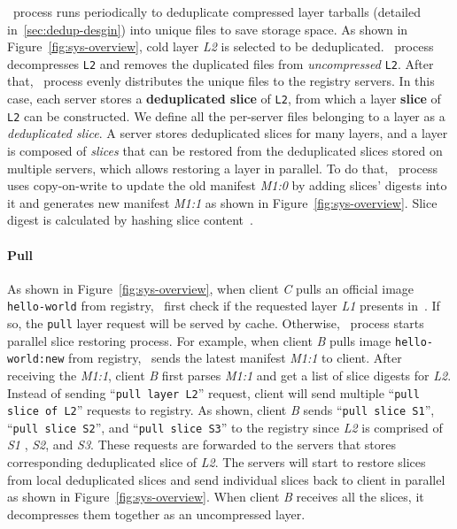 \dedupname~process runs periodically to deduplicate compressed layer tarballs (detailed in~\cref{sec:dedup-desgin})
into unique files to save storage space.
As shown in Figure~\ref{fig:sys-overview}, cold layer \textit{L2} is selected to be deduplicated.
\dedupname~process decompresses \texttt{L2} and removes the duplicated files from \emph{uncompressed} \texttt{L2}.
After that, \dedupname~process evenly distributes the unique files to the registry servers.
In this case, each server stores a \textbf{deduplicated slice} of \texttt{L2}, from which a layer \textbf{slice} of \texttt{L2}
can be constructed.
We define all the per-server files belonging to a layer as a {\em deduplicated slice}. 
A server stores deduplicated slices for many layers, 
and a layer is composed of \emph{slices} 
that can be restored from the deduplicated slices stored on multiple servers, 
which allows restoring a layer in parallel. 
To do that, 
\dedupname~process uses copy-on-write to update the old manifest \textit{M1:0} by adding slices' digests into it 
and generates new manifest \textit{M1:1} as shown in Figure~\ref{fig:sys-overview}.
Slice digest is calculated by hashing slice content~\cite{xxx}.

\paragraph{Pull}

As shown in Figure~\ref{fig:sys-overview},
when client \textit{C} pulls an official image \texttt{hello-world} from registry,
\sysname~first check if the requested layer \textit{L1} presents in~\preconstructcachename.
If so, the \texttt{pull} layer request will be served by cache.
Otherwise, \dedupname~process starts parallel slice restoring process.
For example, when client \textit{B} pulls image \texttt{hello-world:new} from registry,
\sysname~sends the latest manifest \textit{M1:1} to client.
After receiving the \textit{M1:1}, client \textit{B} first parses \textit{M1:1} and get a list of slice digests for \textit{L2}.
Instead of sending ``\texttt{pull layer L2}'' request, client will send multiple ``\texttt{pull slice of L2}'' requests to registry.
As shown, client \textit{B} sends ``\texttt{pull slice S1}'', ``\texttt{pull slice S2}'', and 
``\texttt{pull slice S3}'' to the registry 
since \textit{L2} is comprised of \textit{S1} , \textit{S2}, and \textit{S3}.
These requests are forwarded to the servers that stores corresponding deduplicated slice of \textit{L2}.
The servers will start to restore slices from local deduplicated slices and send individual slices back to client 
in parallel as shown in Figure~\ref{fig:sys-overview}. 
When client \textit{B} receives all the slices, it decompresses them together as an uncompressed layer.

